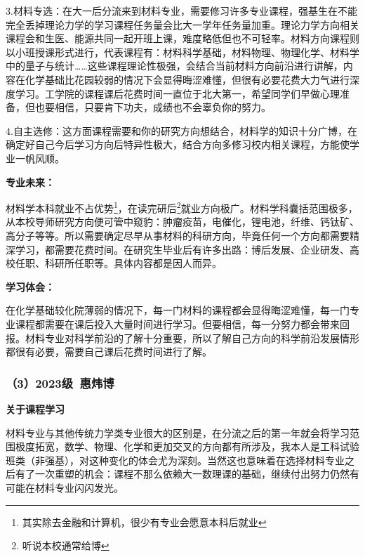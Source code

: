 3.材料专选：在大一后分流来到材料专业，需要修习许多专业课程，强基生在不能完全丢掉理论力学的学习课程任务量会比大一学年任务量加重。理论力学方向相关课程会和生医、能源共同一起开班上课，难度略低但也不可轻率。材料方向课程则以小班授课形式进行，代表课程有：材料科学基础，材料物理、物理化学、材料学中的量子与统计……这些课程理论性极强，会结合当前材料方向前沿进行讲解，内容在化学基础比花园较弱的情况下会显得晦涩难懂，但很有必要花费大力气进行深度学习。工学院的课程课后花费时间一直位于北大第一，希望同学们早做心理准备，但也要相信，只要肯下功夫，成绩也不会辜负你的努力。

\vspace{10pt}

4.自主选修：这方面课程需要和你的研究方向想结合，材料学的知识十分广博，在确定好自己今后学习方向后特异性极大，结合方向多修习校内相关课程，方能使学业一帆风顺。

\vspace{10pt}

\textbf{专业未来：}

材料学本科就业不占优势\footnote{其实除去金融和计算机，很少有专业会愿意本科后就业}，在读完研后\footnote{听说本校通常给博}就业方向极广。材料学科囊括范围极多，从本校导师研究方向便可管中窥豹：肿瘤疫苗，电催化，锂电池，纤维、钙钛矿、高分子等等。所以需要确定尽早从事材料的科研方向，毕竟任何一个方向都需要精深学习，都需要花费时间。在研究生毕业后有许多出路：博后发展、企业研发、高校任职、科研所任职等。具体内容都是因人而异。

\vspace{10pt}

\textbf{学习体会：}

在化学基础较化院薄弱的情况下，每一门材料的课程都会显得晦涩难懂，每一门专业课程都需要在课后投入大量时间进行学习。但要相信，每一分努力都会带来回报。材料专业对科学前沿的了解十分重要，所以了解自己方向的科学前沿发展情形都很有必要，需要自己课后花费时间进行了解。

\subsubsection{（3）2023级\ 惠炜博}

\textbf{关于课程学习}

材料专业与其他传统力学类专业很大的区别是，在分流之后的第一年就会将学习范围极度拓宽，数学、物理、化学和更加交叉的方向都有所涉及，我本人是工科试验班类（非强基），对这种变化的体会尤为深刻。当然这也意味着在选择材料专业之后有了一次重塑的机会：课程不那么依赖大一数理课的基础，继续付出努力仍然有可能在材料专业闪闪发光。

